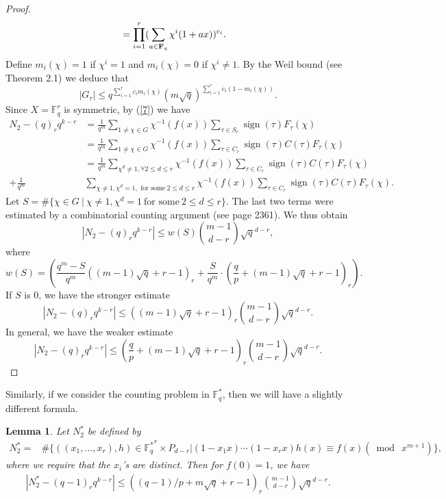 \documentclass[reqno]{amsart}
\newtheorem{lem}[thm]{Lemma}
\theoremstyle{remark}
\numberwithin{equation}{section}
\DeclareMathOperator{\sign}{sign}
\newcommand{\f}{\mathbb{F}_q}
\begin{document}
\begin{proof}
\begin{align*}
&=\prod_{i=1}^{r}(\sum_{a\in{{\bf{F}}_q}}\chi^i(1+ax))^{c_i}.
 \end{align*}
Define $ m_i(\chi)=1$ if $\chi^i=1$ and  $ m_i(\chi)=0$ if $\chi^i\neq1$.
By the Weil bound (see \cite{Wan} Theorem 2.1) we deduce that
$$|G_{\tau}| \leq  q^{\sum_{i=1}^{r}c_im_i(\chi)}(m\sqrt{q})^{\sum_{i=1}^{r}
c_i(1-m_i(\chi))}.$$
Since $X=\f^r$ is symmetric, by (\ref{7}) we have
   \begin{align*}
  N_2-{(q)_r q^{k-r}}&=\frac {1} {q^m}\sum_{1\ne \chi\in G }\chi^{-1}(f(x))\sum_{\tau\in S_r}{\sign(\tau)F_{\tau}(\chi)}\\
  &=\frac {1} {q^m}\sum_{1\ne \chi\in G }\chi^{-1}(f(x))\sum_{\tau\in C_{r}}\sign(\tau)  C(\tau) F_{\tau}(\chi)\\
&=\frac{1}{q^m} \sum_{\chi^d \neq 1, \forall 2\leq d\leq r}\chi^{-1}(f(x))
\sum_{\tau\in C_{r}}\sign(\tau)C(\tau) F_{\tau}(\chi)\\
+\frac{1}{q^m}&\sum_{\chi\neq 1, \chi^d=1, \text{ for some}\  2\leq d\leq r
}\chi^{-1}(f(x)) \sum_{\tau\in C_{r}}\sign(\tau)C(\tau)
F_{\tau}(\chi).
 \end{align*}
 Let $S=\#\{\chi \in G\ |\  \chi\ne1, \chi^d = 1~ \text{for some}\  2\leq d\leq r \}$.
 The last two terms were estimated by a combinatorial counting argument (see \cite{LW3} page 2361).
 We thus obtain
 $$\left|  N_2-{(q)_r q^{k-r}}\right|\leq  w(S){m-1 \choose d-r} \sqrt{q}^{d-r},$$
 where $$w(S)=\left(\frac{q^m-S}{q^m}((m-1)\sqrt{q}+r-1)_{r}
+\frac {S} {q^m}\cdot(\frac {q}p+(m-1)\sqrt{q}+r-1)_{r}\right).$$
If $S$ is 0, we have the stronger estimate
   $$\left|  N_2-{(q)_r q^{k-r}}\right|\leq ((m-1)\sqrt{q}+r-1)_{r}{m-1 \choose d-r} \sqrt{q}^{d-r}. $$
 In general, we have the weaker estimate
 $$\left|  N_2-{(q)_r q^{k-r}}\right|\leq (\frac {q}p+(m-1)\sqrt{q}+r-1)_{r}{m-1 \choose d-r} \sqrt{q}^{d-r}. $$ \end{proof}




Similarly, if we consider the counting problem in $\f^*$, then we will
have a slightly different formula.
 \begin{lem}\label{lem3.6}  Let $N_2^*$ be defined by
\begin{align*}
N_2^*=&\#\{((x_1,  \dots, x_r), h)\in {\f^*}^r\times P_{d-r} \big | (1-x_1x)\cdots(1-x_r x)h(x)\equiv f(x)(\bmod \ x^{m+1})\},
 \end{align*}
 where we require that the $x_i$'s are distinct.
 Then for $f(0)=1$, we have      \begin{align*}
\left| N_2^*-(q-1)_rq^{k-r} \right| \leq  ((q-1)/p+m\sqrt{q}+r-1)_r{m-1 \choose d-r} \sqrt{q}^{d-r}.
 \end{align*}
 \end{lem}
\end{document}
